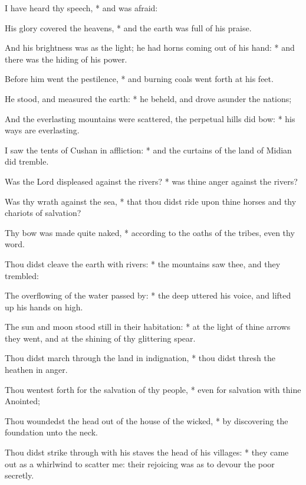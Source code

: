 \begin{multicols}{2}
 I have heard thy speech, * and was afraid:\par
{}
His glory covered the heavens, * and the earth was full of his praise.\par
And his brightness was as the light; {\dag} he had horns coming out of his hand: * and there was the hiding of his power.\par
Before him went the pestilence, * and burning coals went forth at his feet.\par
He stood, and measured the earth: * he beheld, and drove asunder the nations;\par
And the everlasting mountains were scattered, {\dag} the perpetual hills did bow: * his ways are everlasting.\par
I saw the tents of Cushan in affliction: * and the curtains of the land of Midian did tremble.\par
Was the Lord displeased against the rivers? * was thine anger against the rivers?\par
Was thy wrath against the sea, * that thou didst ride upon thine horses and thy chariots of salvation?\par
Thy bow was made quite naked, * according to the oaths of the tribes, even thy word.\par
Thou didst cleave the earth with rivers: * the mountains saw thee, and they trembled:\par
The overflowing of the water passed by: * the deep uttered his voice, and lifted up his hands on high.\par
The sun and moon stood still in their habitation: * at the light of thine arrows they went, and at the shining of thy glittering spear.\par
Thou didst march through the land in indignation, * thou didst thresh the heathen in anger.\par
Thou wentest forth for the salvation of thy people, * even for salvation with thine Anointed;\par
Thou woundedst the head out of the house of the wicked, * by discovering the foundation unto the neck.\par
Thou didst strike through with his staves the head of his villages: * they came out as a whirlwind to scatter me: their rejoicing was as to devour the poor secretly.\par

\end{multicols}
